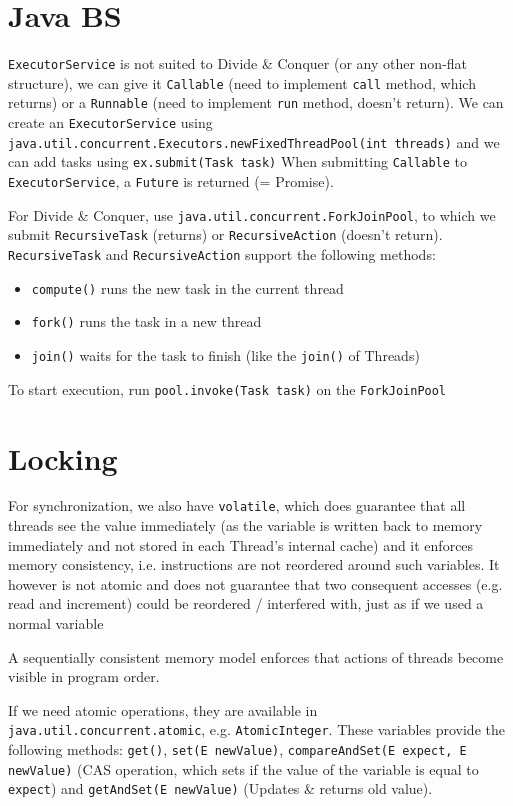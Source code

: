 \documentclass{article}
\begin{document}
\newsection
\section{Java BS}
\verb|ExecutorService| is not suited to Divide \& Conquer (or any other non-flat structure), we can give it \verb|Callable| (need to implement \verb|call| method, which returns) or a \verb|Runnable| (need to implement \verb|run| method, doesn't return).
We can create an \verb|ExecutorService| using \verb|java.util.concurrent.Executors.newFixedThreadPool(int threads)| and we can add tasks using \verb|ex.submit(Task task)|
When submitting \verb|Callable| to \verb|ExecutorService|, a \verb|Future| is returned (= Promise).

For Divide \& Conquer, use \verb|java.util.concurrent.ForkJoinPool|, to which we submit \verb|RecursiveTask| (returns) or \verb|RecursiveAction| (doesn't return).
\verb|RecursiveTask| and \verb|RecursiveAction| support the following methods:
\begin{itemize}
    \item \verb|compute()| runs the new task in the current thread
    \item \verb|fork()| runs the task in a new thread
    \item \verb|join()| waits for the task to finish (like the \verb|join()| of Threads)
\end{itemize}
To start execution, run \verb|pool.invoke(Task task)| on the \verb|ForkJoinPool|


\newsection
\section{Locking}
For synchronization, we also have \verb|volatile|, which does guarantee that all threads see the value immediately (as the variable is written back to memory immediately and not stored in each Thread's internal cache) and it enforces memory consistency, i.e. instructions are not reordered around such variables.
It however is not atomic and does not guarantee that two consequent accesses (e.g. read and increment) could be reordered / interfered with, just as if we used a normal variable

A sequentially consistent memory model enforces that actions of threads become visible in program order.

If we need atomic operations, they are available in \verb|java.util.concurrent.atomic|, e.g. \verb|AtomicInteger|.
These variables provide the following methods: \verb|get()|, \verb|set(E newValue)|, \verb|compareAndSet(E expect, E newValue)| (CAS operation, which sets if the value of the variable is equal to \verb|expect|) and \verb|getAndSet(E newValue)| (Updates \& returns old value).
\end{document}
